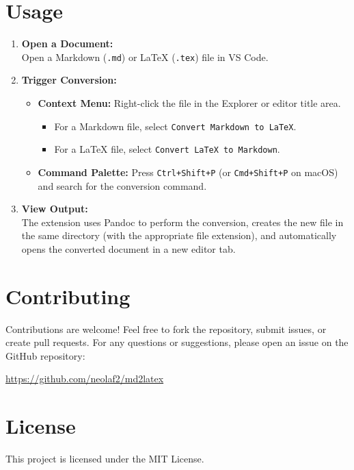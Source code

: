 \documentclass{article}
\begin{document}
\section{Usage}
\begin{enumerate}
  \item \textbf{Open a Document:}\\
  Open a Markdown (\texttt{.md}) or LaTeX (\texttt{.tex}) file in VS Code.
  
  \item \textbf{Trigger Conversion:}
  \begin{itemize}
    \item \textbf{Context Menu:} Right-click the file in the Explorer or editor title area.
      \begin{itemize}
        \item For a Markdown file, select \texttt{Convert Markdown to LaTeX}.
        \item For a LaTeX file, select \texttt{Convert LaTeX to Markdown}.
      \end{itemize}
    \item \textbf{Command Palette:} Press \texttt{Ctrl+Shift+P} (or \texttt{Cmd+Shift+P} on macOS) and search for the conversion command.
  \end{itemize}
  
  \item \textbf{View Output:}\\
  The extension uses Pandoc to perform the conversion, creates the new file in the same directory (with the appropriate file extension), and automatically opens the converted document in a new editor tab.
\end{enumerate}

\section{Contributing}
Contributions are welcome! Feel free to fork the repository, submit issues, or create pull requests. For any questions or suggestions, please open an issue on the GitHub repository:
\begin{center}
\url{https://github.com/neolaf2/md2latex}
\end{center}

\section{License}
This project is licensed under the MIT License.
\end{document}
